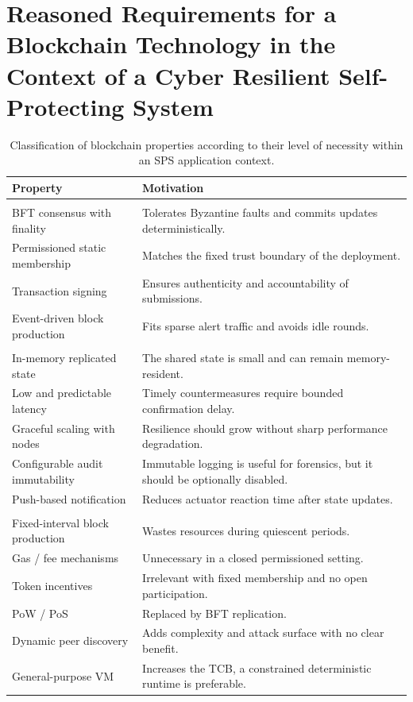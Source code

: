 \section{Reasoned Requirements for a Blockchain Technology in the Context of a Cyber Resilient Self-Protecting System}\label{sec:requirements}

\begin{table}
\centering
\small
\caption{Classification of blockchain properties according to their level of necessity within an SPS application context.}
\label{tab:blockchain_features}
\renewcommand{\arraystretch}{1.22}
\setlength{\tabcolsep}{5pt}

\begin{tabularx}{\linewidth}{
>{\raggedright\arraybackslash}p{4.3cm}
X
}
\toprule
\textbf{Property} & \textbf{Motivation} \\
\midrule

\rowcolor{reqc}
\multicolumn{2}{l}{\textbf{Required}} \\
BFT consensus with finality & Tolerates Byzantine faults and commits updates deterministically. \\
Permissioned static membership & Matches the fixed trust boundary of the deployment. \\
Transaction signing & Ensures authenticity and accountability of submissions. \\
Event-driven block production & Fits sparse alert traffic and avoids idle rounds. \\[3pt]

\rowcolor{desc}
\multicolumn{2}{l}{\textbf{Desirable}} \\
In-memory replicated state & The shared state is small and can remain memory-resident. \\
Low and predictable latency & Timely countermeasures require bounded confirmation delay. \\
Graceful scaling with nodes & Resilience should grow without sharp performance degradation. \\
Configurable audit immutability & Immutable logging is useful for forensics, but it should be optionally disabled. \\
Push-based notification & Reduces actuator reaction time after state updates. \\[3pt]

\rowcolor{nac}
\multicolumn{2}{l}{\textbf{Not needed}} \\
Fixed-interval block production & Wastes resources during quiescent periods. \\
Gas / fee mechanisms & Unnecessary in a closed permissioned setting. \\
Token incentives & Irrelevant with fixed membership and no open participation. \\
PoW / PoS & Replaced by BFT replication. \\
Dynamic peer discovery & Adds complexity and attack surface with no clear benefit. \\
General-purpose VM & Increases the TCB, a constrained deterministic runtime is preferable. \\
\bottomrule
\end{tabularx}
\end{table}


